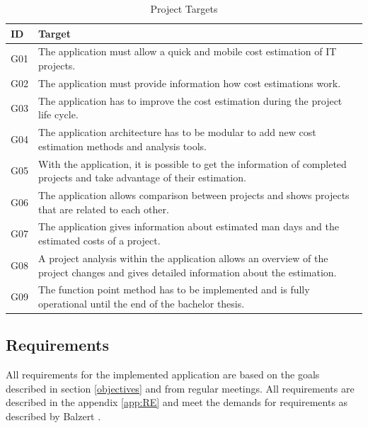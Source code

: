 \begin{table}[h]
	\centering 
	\setlength{\tabcolsep}{4pt}
	\begin{tabular}{|l||p{14cm}|}\hline
		ID		& Target\\ \hline\hline
		G01  	& The application must allow a quick and mobile cost estimation of IT projects.\\ \hline
		G02  	& The application must provide information how cost estimations work.\\ \hline
		G03  	& The application has to improve the cost estimation during  the project life cycle.\\ \hline
		G04  	& The application architecture has to be modular to add new cost estimation methods and analysis tools.\\ \hline
		G05  	& With the application, it is possible to get the information of completed projects and take advantage of their estimation.\\ \hline
		G06  	& The application allows comparison between projects and shows projects that are related to each other.\\ \hline
		G07  	& The application gives information about estimated man days and the estimated costs of a project.\\ \hline
		G08  	& A project analysis within the application allows an overview of the project changes and gives detailed information about the estimation.\\ \hline
		G09  	& The function point method has to be implemented and is fully operational until the end of the bachelor thesis.\\ \hline
	\end{tabular} 
	\caption{Project Targets} 
	\label{projecttargets} 
\end{table}

\subsection{Requirements}\label{requirements}

All requirements for the implemented application are based on the goals described in section \ref{objectives} and from regular meetings. All requirements are described in the appendix \ref{app:RE} and meet the demands for requirements as described by Balzert \cite{basiskonzepteRE}.\\


